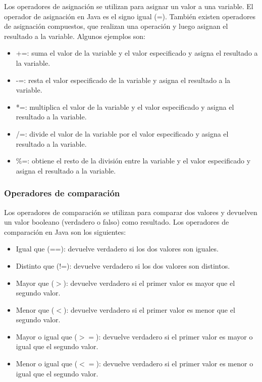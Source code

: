 \documentclass[executivepaper]{article}
\begin{document}
Los operadores de asignación se utilizan para asignar un valor a una variable. El operador de asignación en Java es el signo igual (=). También existen operadores de asignación compuestos, que realizan una operación y luego asignan el resultado a la variable. Algunos ejemplos son:

\begin{itemize}
\item +=: suma el valor de la variable y el valor especificado y asigna el resultado a la variable.
\item -=: resta el valor especificado de la variable y asigna el resultado a la variable.
\item *=: multiplica el valor de la variable y el valor especificado y asigna el resultado a la variable.
\item /=: divide el valor de la variable por el valor especificado y asigna el resultado a la variable.
\item \%=: obtiene el resto de la división entre la variable y el valor especificado y asigna el resultado a la variable.
\end{itemize}

\subsubsection*{Operadores de comparación}

Los operadores de comparación se utilizan para comparar dos valores y devuelven un valor booleano (verdadero o falso) como resultado. Los operadores de comparación en Java son los siguientes:

\begin{itemize}
\item Igual que (==): devuelve verdadero si los dos valores son iguales.
\item Distinto que (!=): devuelve verdadero si los dos valores son distintos.
\item Mayor que ($>$): devuelve verdadero si el primer valor es mayor que el segundo valor.
\item Menor que ($<$): devuelve verdadero si el primer valor es menor que el segundo valor.
\item Mayor o igual que ($>=$): devuelve verdadero si el primer valor es mayor o igual que el segundo valor.
\item Menor o igual que ($<=$): devuelve verdadero si el primer valor es menor o igual que el segundo valor.
\end{itemize}
\end{document}
